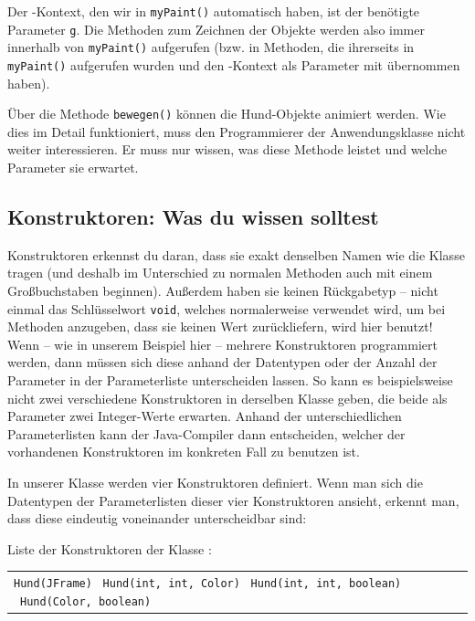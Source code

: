 Der -Kontext, den wir in \lstinline|myPaint()| automatisch
haben, ist der benötigte Parameter \lstinline|g|. Die Methoden zum Zeichnen der
Objekte werden also immer innerhalb von \lstinline|myPaint()| aufgerufen (bzw.
in Methoden, die ihrerseits in \lstinline|myPaint()| aufgerufen wurden und den
-Kontext als Parameter mit übernommen haben).

Über die Methode \lstinline|bewegen()| können die Hund-Objekte animiert werden.
Wie dies im Detail funktioniert, muss den Programmierer der Anwendungsklasse nicht
weiter interessieren. Er muss nur wissen, was diese Methode leistet und welche Parameter
sie erwartet.

\subsection{Konstruktoren: Was du wissen solltest}

Konstruktoren erkennst du daran, dass sie exakt denselben Namen wie die Klasse
tragen (und deshalb im Unterschied zu normalen Methoden auch mit einem
Großbuchstaben beginnen). Außerdem haben sie keinen Rückgabetyp -- nicht einmal
das Schlüsselwort \lstinline|void|, welches normalerweise verwendet wird, um bei
Methoden anzugeben, dass sie keinen Wert zurückliefern, wird hier benutzt!
Wenn -- wie in unserem Beispiel hier -- mehrere Konstruktoren programmiert
werden, dann müssen sich diese anhand der Datentypen oder der Anzahl der Parameter in der Parameterliste
unterscheiden lassen. So kann es beispielsweise nicht zwei verschiedene
Konstruktoren in derselben Klasse geben, die beide als Parameter zwei Integer-Werte
erwarten. Anhand der unterschiedlichen Parameterlisten kann der
Java-Compiler dann entscheiden, welcher der vorhandenen Konstruktoren im
konkreten Fall zu benutzen ist.

In unserer Klasse  werden vier Konstruktoren definiert. Wenn man
sich die Datentypen der Parameterlisten dieser vier Konstruktoren ansieht,
erkennt man, dass diese eindeutig voneinander unterscheidbar sind:

Liste der Konstruktoren der Klasse :

\begin{tabular}{l}
\lstinline|Hund(JFrame)| \
\lstinline|Hund(int, int, Color)| \
\lstinline|Hund(int, int, boolean)| \
\lstinline|Hund(Color, boolean)| \
\end{tabular}

\vspace{1mm}


